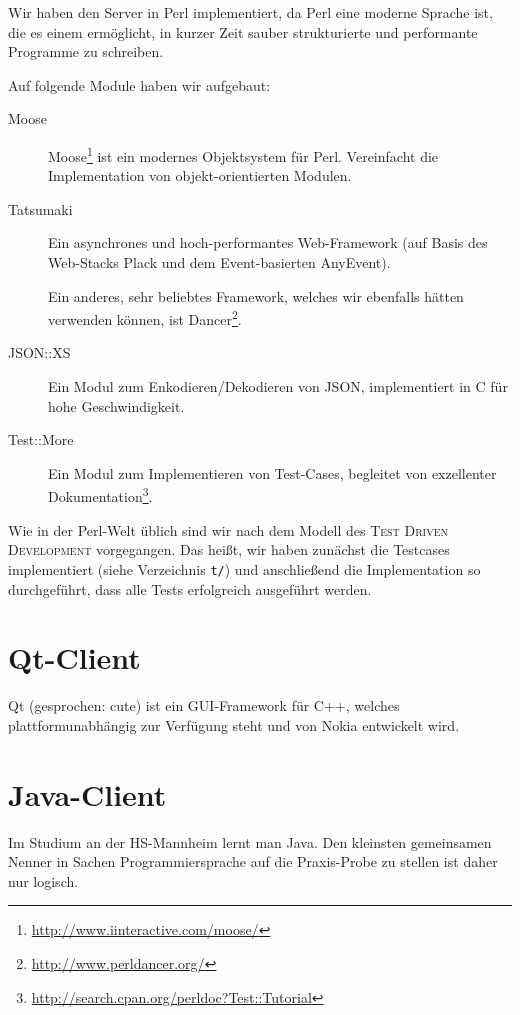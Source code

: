 \documentclass[12pt, a4paper]{scrartcl}
\begin{document}
Wir haben den Server in Perl implementiert, da Perl eine moderne Sprache ist,
die es einem ermöglicht, in kurzer Zeit sauber strukturierte und performante
Programme zu schreiben.
\np

Auf folgende Module haben wir aufgebaut:
\begin{description}
	\item[Moose] Moose\footnote{\url{http://www.iinteractive.com/moose/}}
	ist ein modernes Objektsystem für Perl. Vereinfacht die Implementation
	von objekt-orientierten Modulen.

	\item[Tatsumaki] Ein asynchrones und hoch-performantes Web-Framework
	(auf Basis des Web-Stacks Plack und dem Event-basierten AnyEvent).

	Ein anderes, sehr beliebtes Framework, welches wir ebenfalls hätten
	verwenden können, ist
	Dancer\footnote{\url{http://www.perldancer.org/}}.

	\item[JSON::XS] Ein Modul zum Enkodieren/Dekodieren von JSON,
	implementiert in C für hohe Geschwindigkeit.

	\item[Test::More] Ein Modul zum Implementieren von Test-Cases,
	begleitet von exzellenter
	Dokumentation\footnote{\url{http://search.cpan.org/perldoc?Test::Tutorial}}.
\end{description}

Wie in der Perl-Welt üblich sind wir nach dem Modell des \textsc{Test Driven
Development} vorgegangen. Das heißt, wir haben zunächst die Testcases
implementiert (siehe Verzeichnis \texttt{t/}) und anschließend die
Implementation so durchgeführt, dass alle Tests erfolgreich ausgeführt werden.
\np

\clearpage
\section{Qt-Client}

Qt (gesprochen: cute) ist ein GUI-Framework für C++, welches
plattformunabhängig zur Verfügung steht und von Nokia entwickelt wird.
\np


\clearpage
\section{Java-Client}

Im Studium an der HS-Mannheim lernt man Java. Den kleinsten gemeinsamen Nenner
in Sachen Programmiersprache auf die Praxis-Probe zu stellen ist daher nur
logisch.
\np
\end{document}
